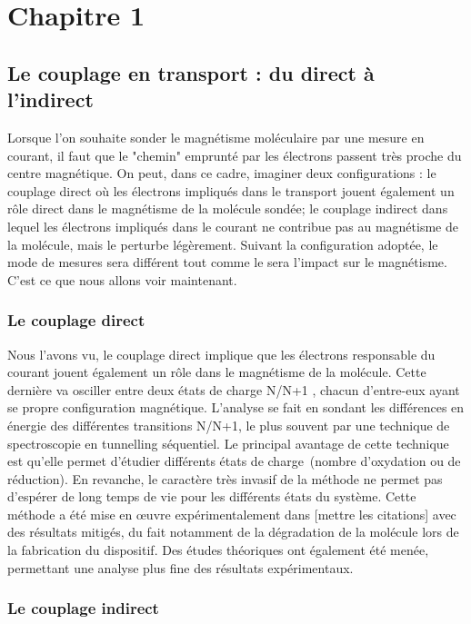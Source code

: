 \chapter{Chapitre 1}

\section{Le couplage en transport : du direct à l'indirect}

Lorsque l'on souhaite sonder le magnétisme moléculaire par une mesure en courant, il faut que le "chemin" emprunté par les électrons passent très proche du centre magnétique. On peut, dans ce cadre, imaginer deux configurations : le couplage direct où les électrons impliqués dans le transport jouent également un rôle direct dans le magnétisme de la molécule sondée; le couplage indirect dans lequel les électrons impliqués dans le courant ne contribue pas au magnétisme de la molécule, mais le perturbe légèrement. Suivant la configuration adoptée, le mode de mesures sera différent tout comme le sera l'impact sur le magnétisme. C'est ce que nous allons voir maintenant.

\subsection{Le couplage direct}
Nous l'avons vu, le couplage direct implique que les électrons responsable du courant jouent également un rôle dans le magnétisme de la molécule. Cette dernière va osciller entre deux états de charge N/N+1 , chacun d'entre-eux ayant se propre configuration magnétique. L'analyse se fait en sondant les différences en énergie des différentes transitions N/N+1, le plus souvent par une technique de spectroscopie en tunnelling séquentiel. Le principal avantage de cette technique est qu'elle permet d'étudier différents états de charge~(nombre d'oxydation ou de réduction). En revanche, le caractère très invasif de la méthode ne permet pas d'espérer de long temps de vie pour les différents états du système. Cette méthode a été mise en œuvre expérimentalement dans [mettre les citations] avec des résultats mitigés, du fait notamment de la dégradation de la molécule lors de la fabrication du dispositif. Des études théoriques ont également été menée, permettant une analyse plus fine des résultats expérimentaux.

\subsection{Le couplage indirect}

